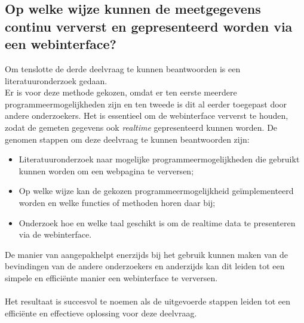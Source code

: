 \subsection{Op welke wijze kunnen de meetgegevens continu ververst en gepresenteerd worden via een webinterface?}
Om tenslotte de derde deelvraag te kunnen beantwoorden is een literatuuronderzoek gedaan. 
\\
Er is voor deze methode gekozen, omdat er ten eerste meerdere programmeermogelijkheden zijn en ten tweede is dit al eerder toegepast door andere onderzoekers. 
Het is essentieel om de webinterface ververst te houden, zodat de gemeten gegevens ook \textit{realtime} gepresenteerd kunnen worden. 
De genomen stappen om deze deelvraag te kunnen beantwoorden zijn:
\begin{itemize}
  \item[\ding{226}] Literatuuronderzoek naar mogelijke programmeermogelijkheden die gebruikt kunnen worden om een webpagina te verversen;
  \item[\ding{226}] Op welke wijze kan de gekozen programmeermogelijkheid geïmplementeerd worden en welke functies of methoden horen daar bij;
  \item[\ding{226}] Onderzoek hoe en welke taal geschikt is om de realtime data te presenteren via de webinterface.
\end{itemize}
De manier van aangepakhelpt enerzijds bij het gebruik kunnen maken van de bevindingen van 
de andere onderzoekers en anderzijds kan dit leiden tot een simpele en efficiënte manier een webinterface te verversen.
\\\\
Het resultaat is succesvol te noemen als de uitgevoerde stappen leiden tot een efficiënte en effectieve oplossing voor deze deelvraag.
